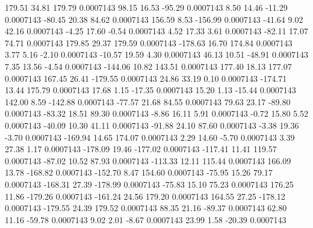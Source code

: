       179.51       34.81      179.79     0.0007143
       98.15       16.53      -95.29     0.0007143
        8.50       14.46      -11.29     0.0007143
      -80.45       20.38       84.62     0.0007143
      156.59        8.53     -156.99     0.0007143
      -41.64        9.02       42.16     0.0007143
       -4.25       17.60       -0.54     0.0007143
        4.52       17.33        3.61     0.0007143
      -82.11       17.07       74.71     0.0007143
      179.85       29.37      179.59     0.0007143
     -178.63       16.70      174.84     0.0007143
        3.77        5.16       -2.10     0.0007143
      -10.57       19.59        4.30     0.0007143
       46.13       10.51      -48.91     0.0007143
        7.35       13.56       -4.54     0.0007143
     -144.06       10.82      143.51     0.0007143
      177.40       18.13      177.07     0.0007143
      167.45       26.41     -179.55     0.0007143
       24.86       33.19        0.10     0.0007143
     -174.71       13.44      175.79     0.0007143
       17.68        1.15      -17.35     0.0007143
       15.20        1.13      -15.44     0.0007143
      142.00        8.59     -142.88     0.0007143
      -77.57       21.68       84.55     0.0007143
       79.63       23.17      -89.80     0.0007143
      -83.32       18.51       89.30     0.0007143
       -8.86       16.11        5.91     0.0007143
       -0.72       15.80        5.52     0.0007143
      -40.09       10.30       41.11     0.0007143
      -91.88       24.10       87.60     0.0007143
       -3.38       19.36       -3.70     0.0007143
     -169.94       14.65      174.07     0.0007143
        2.29       14.60       -5.70     0.0007143
        3.39       27.38        1.17     0.0007143
     -178.09       19.46     -177.02     0.0007143
     -117.41       11.41      119.57     0.0007143
      -87.02       10.52       87.93     0.0007143
     -113.33       12.11      115.44     0.0007143
      166.09       13.78     -168.82     0.0007143
     -152.70        8.47      154.60     0.0007143
      -75.95       15.26       79.17     0.0007143
     -168.31       27.39     -178.99     0.0007143
      -75.83       15.10       75.23     0.0007143
      176.25       11.86     -179.26     0.0007143
     -161.24       24.56      179.20     0.0007143
      164.55       27.25     -178.12     0.0007143
     -179.55       24.39      179.52     0.0007143
       88.35       21.16      -89.37     0.0007143
       62.80       11.16      -59.78     0.0007143
        9.02        2.01       -8.67     0.0007143
       23.99        1.58      -20.39     0.0007143
